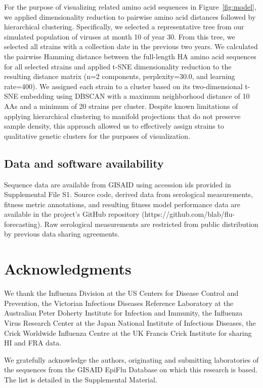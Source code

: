 For the purpose of visualizing related amino acid sequences in Figure~\ref{fig:model}, we applied dimensionality reduction to pairwise amino acid distances followed by hierarchical clustering.
Specifically, we selected a representative tree from our simulated population of viruses at month 10 of year 30.
From this tree, we selected all strains with a collection date in the previous two years.
We calculated the pairwise Hamming distance between the full-length HA amino acid sequences for all selected strains and applied t-SNE dimensionality reduction \citep{vanDerMaaten2008} to the resulting distance matrix (n=2 components, perplexity=30.0, and learning rate=400).
We assigned each strain to a cluster based on its two-dimensional t-SNE embedding using DBSCAN \citep{Ester1996} with a maximum neighborhood distance of 10 AAs and a minimum of 20 strains per cluster.
Despite known limitations of applying hierarchical clustering to manifold projections that do not preserve sample density, this approach allowed us to effectively assign strains to qualitative genetic clusters for the purposes of visualization.

\subsection*{Data and software availability}

Sequence data are available from GISAID using accession ids provided in Supplemental File S1.
Source code, derived data from serological measurements, fitness metric annotations, and resulting fitness model performance data are available in the project's GitHub repository (https://github.com/blab/flu-forecasting).
Raw serological measurements are restricted from public distribution by previous data sharing agreements.

\section*{Acknowledgments}

We thank the Influenza Division at the US Centers for Disease Control and Prevention, the Victorian Infectious Diseases Reference Laboratory at the Australian Peter Doherty Institute for Infection and Immunity, the Influenza Virus Research Center at the Japan National Institute of Infectious Diseases, the Crick Worldwide Influenza Centre at the UK Francis Crick Institute for sharing HI and FRA data.

We gratefully acknowledge the authors, originating and submitting laboratories of the sequences from the GISAID EpiFlu Database \citep{shu2017gisaid} on which this research is based. The list is detailed in the Supplemental Material.

